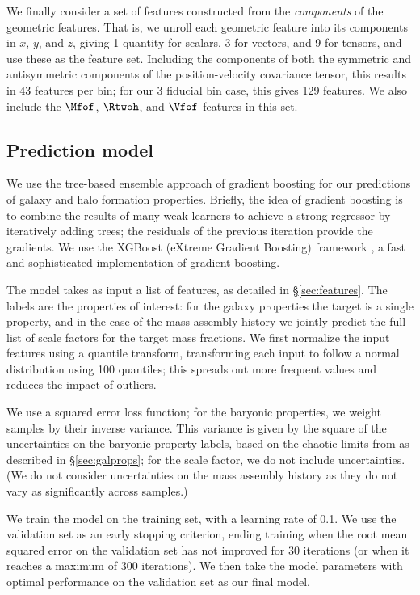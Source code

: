 We finally consider a set of features constructed from the \emph{components} of the geometric features.
That is, we unroll each geometric feature into its components in $x$, $y$, and $z$, giving 1 quantity for scalars, 3 for vectors, and 9 for tensors, and use these as the feature set. 
Including the components of both the symmetric and antisymmetric components of the position-velocity covariance tensor, this results in 43 features per bin; for our 3 fiducial bin case, this gives 129 features.
We also include the $\Mfof$, $\Rtwoh$, and $\Vfof$ features in this set.


\subsection{Prediction model}
\label{sec:prediction_model}

We use the tree-based ensemble approach of gradient boosting \citep{friedman_greedy_2001} for our predictions of galaxy and halo formation properties.
Briefly, the idea of gradient boosting is to combine the results of many weak learners to achieve a strong regressor by iteratively adding trees; the residuals of the previous iteration provide the gradients.
We use the XGBoost (eXtreme Gradient Boosting) framework \citep{chen_xgboost_2016}, a fast and sophisticated implementation of gradient boosting.

The model takes as input a list of features, as detailed in \S\ref{sec:features}.
The labels are the properties of interest: for the galaxy properties the target is a single property, and in the case of the mass assembly history we jointly predict the full list of scale factors for the target mass fractions.
We first normalize the input features using a quantile transform, transforming each input to follow a normal distribution using 100 quantiles; this spreads out more frequent values and reduces the impact of outliers.

We use a squared error loss function; for the baryonic properties, we weight samples by their inverse variance.
This variance is given by the square of the uncertainties on the baryonic property labels, based on the chaotic limits from \cite{Genel2019} as described in \S\ref{sec:galprops}; for the scale factor, we do not include uncertainties.
(We do not consider uncertainties on the mass assembly history as they do not vary as significantly across samples.)

We train the model on the training set, with a learning rate of 0.1.
We use the validation set as an early stopping criterion, ending training when the root mean squared error on the validation set has not improved for 30 iterations (or when it reaches a maximum of 300 iterations).
We then take the model parameters with optimal performance on the validation set as our final model.


